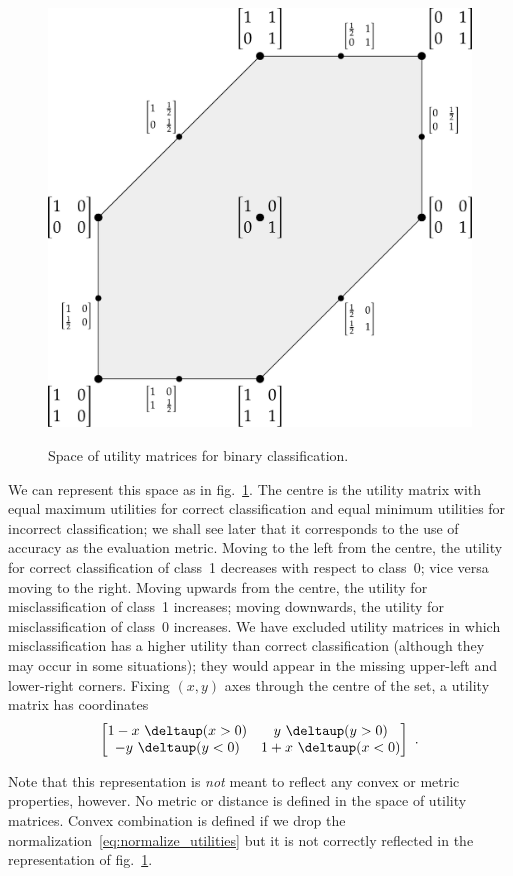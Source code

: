 \documentclass[\ifafour a4paper,12pt,\else a5paper,10pt,\fi%
onecolumn,oneside,article,%
british%
]{memoir}
\theoremstyle{remark}
\theoremstyle{innote}
\newcommand*{\pencil}{{\fontencoding{U}\fontfamily{fontawesometwo}\selectfont\symbol{210}}}
\newcommand{\mynotep}[1]{{\footnotesize\color{notecolour}\pencil\ #1}}
\newcommand*{\delt}{\deltaup}%
\renewcommand*{\|}[1][]{\nonscript\:#1\vert\nonscript\:\mathopen{}}
\newcommand*{\sect}{\S}%
\newcommand*{\fig}{fig.}%
\begin{document}
\begin{figure}[t]
  \centering
  \includegraphics[width=0.65\linewidth]{space_UM2c.pdf}\\
  \caption{Space of utility matrices for binary classification.}
  \label{fig:space_UM}
\end{figure}
We can represent this space as in \fig~\ref{fig:space_UM}. The centre is the utility matrix with equal maximum utilities for correct classification and equal minimum utilities for incorrect classification; we shall see later that it corresponds to the use of accuracy as the evaluation metric. Moving to the left from the centre, the utility for correct classification of class~1 decreases with respect to class~0; vice versa moving to the right. Moving upwards from the centre, the utility for misclassification of class~1 increases; moving downwards, the utility for misclassification of class~0 increases. We have excluded utility matrices in which misclassification has a higher utility than correct classification (although they may occur in some situations); they would appear in the missing upper-left and lower-right corners. Fixing $(x,y)$ axes through the centre of the set, a utility matrix has coordinates
\begin{equation}
  \label{eq:coords_um}
  \begin{bmatrix}
    1 - x\ \delt(x > 0) & y\ \delt(y>0) \\
    -y\ \delt(y<0) & 1 + x\ \delt(x < 0)
  \end{bmatrix} \ .
\end{equation}

Note that this representation is \emph{not} meant to reflect any convex or metric properties, however. No metric or distance is defined in the space of utility matrices. Convex combination is defined if we drop the normalization~\eqref{eq:normalize_utilities} %
but it is not correctly reflected in the representation of \fig~\ref{fig:space_UM}.
\end{document}
